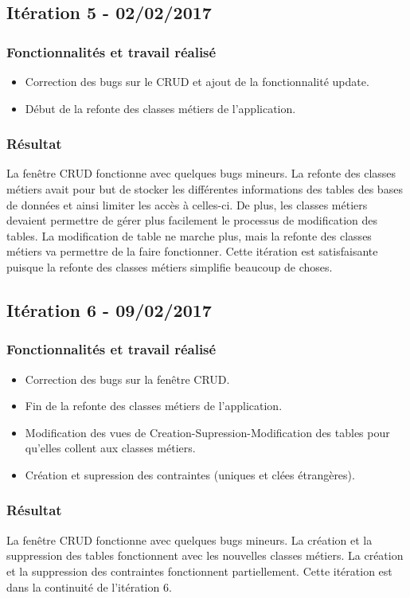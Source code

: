 \subsection{Itération 5 - 02/02/2017}
\subsubsection{Fonctionnalités et travail réalisé}
\begin{itemize}
\item Correction des bugs sur le CRUD et ajout de la fonctionnalité update.
\item Début de la refonte des classes métiers de l'application.
\end{itemize}

\subsubsection{Résultat}
La fenêtre CRUD fonctionne avec quelques bugs mineurs.
La refonte des classes métiers avait pour but de stocker les différentes informations des tables des bases de données et ainsi limiter les accès à celles-ci.
De plus, les classes métiers devaient permettre de gérer plus facilement le processus de modification des tables. 
La modification de table ne marche plus, mais la refonte des classes métiers va permettre de la faire fonctionner.
Cette itération est satisfaisante puisque la refonte des classes métiers simplifie beaucoup de choses. 

\subsection{Itération 6 - 09/02/2017}
\subsubsection{Fonctionnalités et travail réalisé}
\begin{itemize}
\item Correction des bugs sur la fenêtre CRUD.
\item Fin de la refonte des classes métiers de l'application.
\item Modification des vues de Creation-Supression-Modification des tables pour qu'elles collent aux classes métiers.
\item Création et supression des contraintes (uniques et clées étrangères).
\end{itemize}

\subsubsection{Résultat}
La fenêtre CRUD fonctionne avec quelques bugs mineurs.
La création et la suppression des tables fonctionnent avec les nouvelles classes métiers.
La création et la suppression des contraintes fonctionnent partiellement.
Cette itération est dans la continuité de l'itération 6. 

